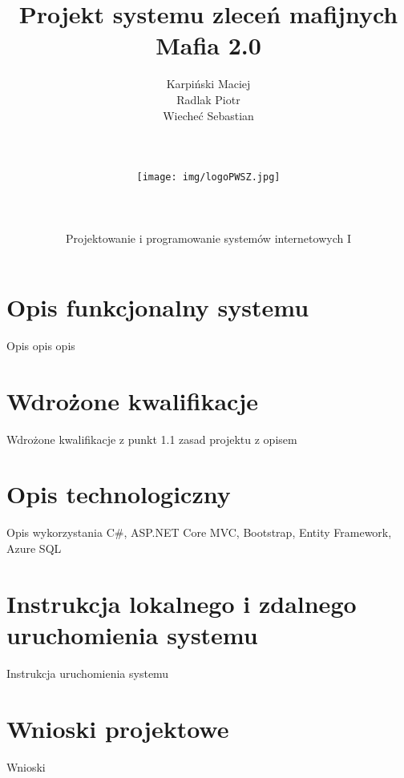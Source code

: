 \documentclass[12pt,a4paper]{article}
\author{Karpiński Maciej\\Radlak Piotr\\Wiecheć Sebastian\\\\\\\\\texttt{[image: img/logoPWSZ.jpg]}\\\\\\\\Projektowanie i programowanie systemów internetowych I}
\title{Projekt systemu zleceń mafijnych\\Mafia 2.0}
\begin{document}
	\maketitle
	\newpage

	\section{Opis funkcjonalny systemu}
		Opis opis opis
	
	\section{Wdrożone kwalifikacje}
		Wdrożone kwalifikacje z punkt 1.1 zasad projektu z opisem
	
	\section{Opis technologiczny}
		Opis wykorzystania C\#, ASP.NET Core MVC, Bootstrap, Entity Framework, Azure SQL
	
	\section{Instrukcja lokalnego i zdalnego uruchomienia systemu}
		Instrukcja uruchomienia systemu
	
	\section{Wnioski projektowe}
		Wnioski
\end{document}
